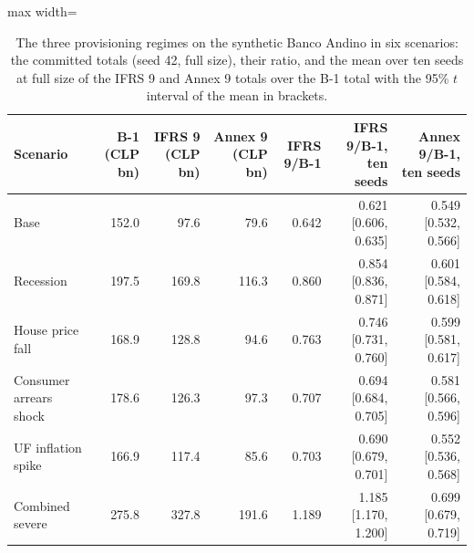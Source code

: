 \begin{table}[htbp]
\centering
\small
\caption{The three provisioning regimes on the synthetic Banco Andino in six scenarios: the committed totals (seed 42, full size), their ratio, and the mean over ten seeds at full size of the IFRS 9 and Annex 9 totals over the B-1 total with the 95\% $t$ interval of the mean in brackets.}
\label{tab:regimes}
\begin{adjustbox}{max width=\textwidth}
\begin{tabular}{lrrrrrr}
\toprule
Scenario & B-1 (CLP bn) & IFRS 9 (CLP bn) & Annex 9 (CLP bn) & IFRS 9/B-1 & IFRS 9/B-1, ten seeds & Annex 9/B-1, ten seeds \\
\midrule
Base & 152.0 & 97.6 & 79.6 & 0.642 & 0.621 [0.606, 0.635] & 0.549 [0.532, 0.566] \\
Recession & 197.5 & 169.8 & 116.3 & 0.860 & 0.854 [0.836, 0.871] & 0.601 [0.584, 0.618] \\
House price fall & 168.9 & 128.8 & 94.6 & 0.763 & 0.746 [0.731, 0.760] & 0.599 [0.581, 0.617] \\
Consumer arrears shock & 178.6 & 126.3 & 97.3 & 0.707 & 0.694 [0.684, 0.705] & 0.581 [0.566, 0.596] \\
UF inflation spike & 166.9 & 117.4 & 85.6 & 0.703 & 0.690 [0.679, 0.701] & 0.552 [0.536, 0.568] \\
Combined severe & 275.8 & 327.8 & 191.6 & 1.189 & 1.185 [1.170, 1.200] & 0.699 [0.679, 0.719] \\
\bottomrule
\end{tabular}
\end{adjustbox}
\end{table}
